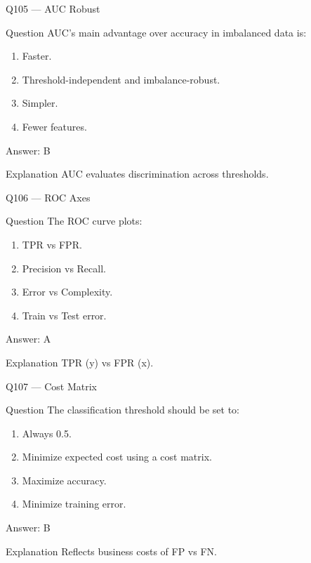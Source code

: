 \documentclass[aspectratio=169,8pt]{beamer}
\begin{document}
	\begin{frame}{Q105 --- AUC Robust}
		\begin{block}{Question}
			AUC's main advantage over accuracy in imbalanced data is:
		\end{block}
		\begin{enumerate}
			\item Faster.
			\item Threshold-independent and imbalance-robust.
			\item Simpler.
			\item Fewer features.
		\end{enumerate}
		\begin{exampleblock}{Answer: B}\end{exampleblock}
		\begin{block}{Explanation}
			AUC evaluates discrimination across thresholds.
		\end{block}
	\end{frame}
	
	\begin{frame}{Q106 --- ROC Axes}
		\begin{block}{Question}
			The ROC curve plots:
		\end{block}
		\begin{enumerate}
			\item TPR vs FPR.
			\item Precision vs Recall.
			\item Error vs Complexity.
			\item Train vs Test error.
		\end{enumerate}
		\begin{exampleblock}{Answer: A}\end{exampleblock}
		\begin{block}{Explanation}
			TPR (y) vs FPR (x).
		\end{block}
	\end{frame}
	
	\begin{frame}{Q107 --- Cost Matrix}
		\begin{block}{Question}
			The classification threshold should be set to:
		\end{block}
		\begin{enumerate}
			\item Always 0.5.
			\item Minimize expected cost using a cost matrix.
			\item Maximize accuracy.
			\item Minimize training error.
		\end{enumerate}
		\begin{exampleblock}{Answer: B}\end{exampleblock}
		\begin{block}{Explanation}
			Reflects business costs of FP vs FN.
		\end{block}
	\end{frame}
	
\end{document}
